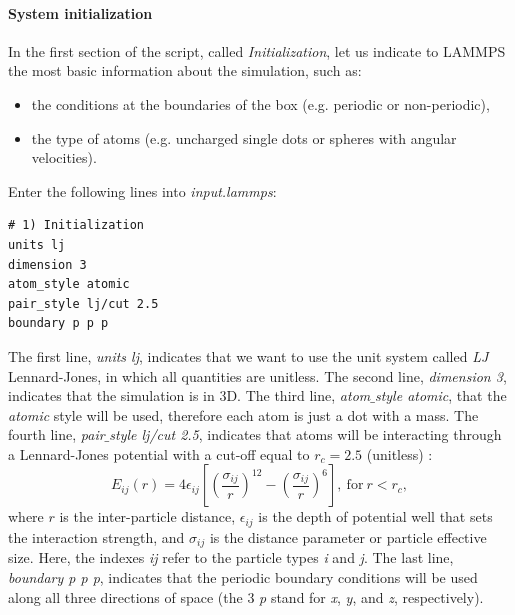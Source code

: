 \documentclass[9pt,tutorial]{livecoms}
\begin{document}
\paragraph{System initialization}
In the first section of the script, called \textit{Initialization}, let us indicate to LAMMPS the most basic information about the simulation, such as:
\begin{itemize}
\item the conditions at the boundaries of the box (e.g. periodic or non-periodic),
\item the type of atoms (e.g. uncharged single dots or spheres with angular velocities).
\end{itemize}
Enter the following lines into \textit{input.lammps}:
{\normalsize \begin{verbatim}
# 1) Initialization
units lj
dimension 3
atom_style atomic
pair_style lj/cut 2.5
boundary p p p
\end{verbatim}}
The first line, \textit{units lj}, indicates that we want to use the unit system called \textit{LJ} Lennard-Jones, in which all quantities are unitless. The second line, \textit{dimension 3}, indicates that the simulation is in 3D. The third line, \textit{atom$\_$style atomic}, that the \textit{atomic} style
will be used, therefore each atom is just a dot with a mass. The fourth line, \textit{pair$\_$style lj/cut 2.5}, indicates that atoms will be interacting through a Lennard-Jones potential with a cut-off equal to $r_c = 2.5$ (unitless) \cite{wang2020lennard,fischer2023history}:
$$E_{ij} (r) = 4 \epsilon_{ij} \left[ \left( \dfrac{\sigma_{ij}}{r} \right)^{12} - \left( \dfrac{\sigma_{ij}}{r} \right)^{6} \right], ~ \text{for} ~ r < r_c,$$
where $r$ is the inter-particle distance, $\epsilon_{ij}$ is the depth of potential well that sets the interaction strength, and $\sigma_{ij}$ is the distance parameter or particle effective size. Here, the indexes \textit{ij} refer to the particle types \textit{i} and \textit{j}. The last line, \textit{boundary p p p}, indicates that the periodic boundary conditions will be used along all three directions of space (the 3 \textit{p} stand for \textit{x}, \textit{y}, and \textit{z}, respectively).
\end{document}
